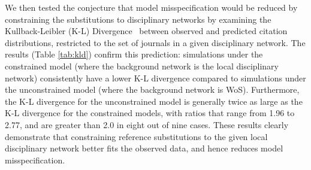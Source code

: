 \documentclass[NETN]{stjour}
\begin{document}
 We then tested the conjecture that model misspecification would be reduced by constraining the substitutions to  disciplinary networks by examining the Kullback-Leibler (K-L) Divergence~\citep{kullback_information_1951} between observed and predicted citation distributions, restricted to  the set of journals in a given disciplinary network.  
The results (Table \ref{tab:kld}) confirm this prediction: simulations under the constrained model 
(where the background network is the local disciplinary network) consistently have a lower K-L divergence compared to simulations under the unconstrained model  (where the background network is WoS).  Furthermore, the K-L divergence for the unconstrained model is generally twice as large as the K-L divergence for the constrained models, with ratios that range from 1.96 to 2.77, and are greater than 2.0 in eight out of nine cases. These results clearly demonstrate that constraining reference substitutions to the given local disciplinary network better fits the observed data, and hence reduces model misspecification.
\end{document}
